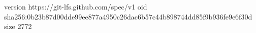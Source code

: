 version https://git-lfs.github.com/spec/v1
oid sha256:0b23b87d00dde99ee877a4950c26dac6b57c44b898744dd85f9b936fe9e6f30d
size 2772
